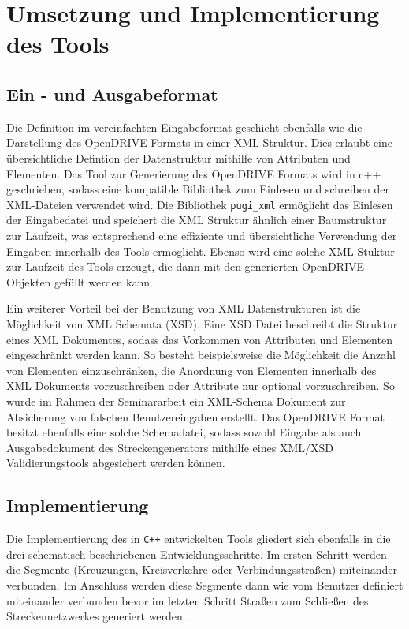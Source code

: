 \chapter{Umsetzung und Implementierung des Tools}

\section{Ein - und Ausgabeformat}
Die Definition im vereinfachten Eingabeformat geschieht ebenfalls wie die Darstellung des OpenDRIVE Formats in einer XML-Struktur. Dies erlaubt eine übersichtliche Defintion der Datenstruktur mithilfe von Attributen und Elementen. Das Tool zur Generierung des OpenDRIVE Formats wird in c++ geschrieben, sodass eine kompatible Bibliothek zum Einlesen und schreiben der XML-Dateien verwendet wird. Die Bibliothek \texttt{pugi\_xml} ermöglicht das Einlesen der Eingabedatei und speichert die XML Struktur ähnlich einer Baumstruktur zur Laufzeit, was entsprechend eine effiziente und übersichtliche Verwendung der Eingaben innerhalb des Tools ermöglicht. Ebenso wird eine solche XML-Stuktur zur Laufzeit des Tools erzeugt, die dann mit den generierten OpenDRIVE Objekten gefüllt werden kann.

Ein weiterer Vorteil bei der Benutzung von XML Datenstrukturen ist die Möglichkeit von XML Schemata (XSD). Eine XSD Datei beschreibt die Struktur eines XML Dokumentes, sodass das Vorkommen von Attributen und Elementen eingeschränkt werden kann. So besteht beispielsweise die Möglichkeit die Anzahl von Elementen einzuschränken, die Anordnung von Elementen innerhalb des XML Dokuments vorzuschreiben oder Attribute nur optional vorzuschreiben. So wurde im Rahmen der Seminararbeit ein XML-Schema Dokument zur Absicherung von falschen Benutzereingaben erstellt. Das OpenDRIVE Format besitzt ebenfalls eine solche Schemadatei, sodass sowohl Eingabe als auch Ausgabedokument des Streckengenerators mithilfe eines XML/XSD Validierungstools abgesichert werden können.

\section{Implementierung}
Die Implementierung des in \texttt{C++} entwickelten Tools gliedert sich ebenfalls in die drei schematisch beschriebenen Entwicklungsschritte. Im ersten Schritt werden die Segmente (Kreuzungen, Kreisverkehre oder Verbindungsstraßen) miteinander verbunden. Im Anschluss werden diese Segmente dann wie vom Benutzer definiert miteinander verbunden bevor im letzten Schritt Straßen zum Schließen des Streckennetzwerkes generiert werden.

